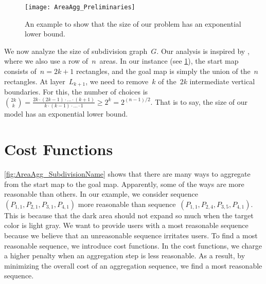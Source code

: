\begin{figure}[tb]
\centering
\texttt{[image: AreaAgg\_Preliminaries]}
\caption{An example to show that the size of our problem 
	has an exponential lower bound.}
\label{fig:AreaAgg_ExponentialSize}
\end{figure}

We now analyze the size of subdivision graph~$G$.
Our analysis is inspired by \textcite{Keane1975Size},
where we also use a row of~$n$~areas.
In our instance
(see \fig\ref{fig:AreaAgg_ExponentialSize}), 
the start map consists of~$n=2k+1$ rectangles,
and the goal map is simply the union of the~$n$ rectangles.
At layer~$L_{k+1}$, we need to remove~$k$ of the~$2k$ 
intermediate vertical boundaries. 
For this, the number of choices is~$
{{2k}\choose{k}}
= \frac{2k\cdot (2k-1)\cdot \ldots \cdot (k+1)}
{k\cdot (k-1)\cdot \ldots \cdot 1}
\ge 2^k = 2^{(n-1)/2}$.
That is to say, the size of our model
has an exponential lower bound.


\section{Cost Functions}
\label{sec:AreaAgg_CostFunctions}

\fig\ref{fig:AreaAgg_SubdivisionName} shows that there are many 
ways to aggregate from the start map to the goal map.
Apparently, some of the ways are more reasonable than 
others.
In our example, we consider 
sequence~$(P_{1,1}, P_{2,1},P_{3,1},P_{4,1})$ 
more reasonable than 
sequence~$(P_{1,1}, P_{2,4},P_{3,5},P_{4,1})$.
This is because that the dark area should not expand so much
when the target color is light gray.
We want to provide users with a most reasonable sequence 
because we believe that an unreasonable sequence irritates users.
To find a most reasonable sequence, we introduce cost functions.
In the cost functions, we charge a higher penalty 
when an aggregation step is less reasonable.
As a result, by minimizing the overall cost of an aggregation 
sequence, we find a most reasonable sequence.

